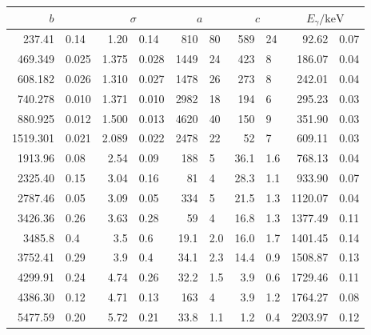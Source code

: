 \label{tab:unbekannt}
	\begin{tabular}{r@{${}\pm{}$}lr@{${}\pm{}$}lr@{${}\pm{}$}lr@{${}\pm{}$}lr@{${}\pm{}$}l}
		\toprule
		\multicolumn{2}{c}{$b$} & \multicolumn{2}{c}{$\sigma$} & \multicolumn{2}{c}{$a$} & \multicolumn{2}{c}{$c$} & \multicolumn{2}{c}{$E_\gamma/\si{\kilo\electronvolt}$} \\
		\midrule
		237.41   & 0.14  & 1.20  & 0.14  & 810    & 80   & 589   & 24  & 92.62   & 0.07 \\
		469.349  & 0.025 & 1.375 & 0.028 & 1449   & 24   & 423   & 8   & 186.07  & 0.04 \\
		608.182  & 0.026 & 1.310 & 0.027 & 1478   & 26   & 273   & 8   & 242.01  & 0.04 \\
		740.278  & 0.010 & 1.371 & 0.010 & 2982   & 18   & 194   & 6   & 295.23  & 0.03 \\
		880.925  & 0.012 & 1.500 & 0.013 & 4620   & 40   & 150   & 9   & 351.90  & 0.03 \\
		1519.301 & 0.021 & 2.089 & 0.022 & 2478   & 22   & 52    & 7   & 609.11  & 0.03 \\
		1913.96  & 0.08  & 2.54  & 0.09  & 188    & 5    & 36.1  & 1.6 & 768.13  & 0.04 \\
		2325.40  & 0.15  & 3.04  & 0.16  & 81     & 4    & 28.3  & 1.1 & 933.90  & 0.07 \\
		2787.46  & 0.05  & 3.09  & 0.05  & 334    & 5    & 21.5  & 1.3 & 1120.07 & 0.04 \\
		3426.36  & 0.26  & 3.63  & 0.28  & 59     & 4    & 16.8  & 1.3 & 1377.49 & 0.11 \\
		3485.8   & 0.4   & 3.5   & 0.6   & 19.1   & 2.0  & 16.0  & 1.7 & 1401.45 & 0.14 \\
		3752.41  & 0.29  & 3.9   & 0.4   & 34.1   & 2.3  & 14.4  & 0.9 & 1508.87 & 0.13 \\
		4299.91  & 0.24  & 4.74  & 0.26  & 32.2   & 1.5  & 3.9   & 0.6 & 1729.46 & 0.11 \\
		4386.30  & 0.12  & 4.71  & 0.13  & 163    & 4    & 3.9   & 1.2 & 1764.27 & 0.08 \\
		5477.59  & 0.20  & 5.72  & 0.21  & 33.8   & 1.1  & 1.2   & 0.4 & 2203.97 & 0.12 \\
		\bottomrule
	\end{tabular}
